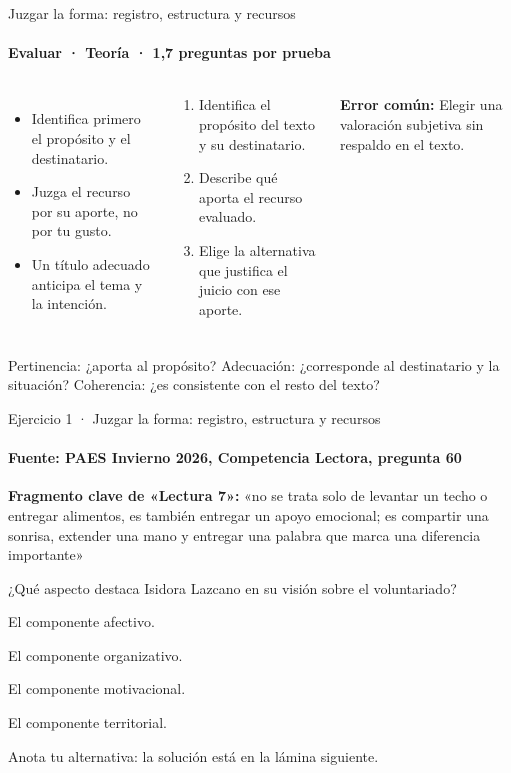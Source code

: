\documentclass[aspectratio=169,11pt]{beamer}
\newcommand{\alternativa}[2]{\begin{opcion}\tecla{#1}\hspace{0.6em}#2\end{opcion}}
\newlength{\ajustealto}
\newenvironment{ajustar}[1][0.74\textheight]
  {\setlength{\ajustealto}{#1}\begin{lrbox}{\ajustecaja}\begin{minipage}{\textwidth}}
  {\end{minipage}\end{lrbox}%
   \ifdim\dimexpr\ht\ajustecaja+\dp\ajustecaja\relax>\ajustealto
     \resizebox*{!}{\ajustealto}{\usebox{\ajustecaja}}\else\usebox{\ajustecaja}\fi}
\begin{document}
\begin{frame}{Juzgar la forma: registro, estructura y recursos}
\label{tema-cl-forma}
\framesubtitle{Evaluar · Teoría · 1,7 preguntas por prueba}
\begin{ajustar}
\begin{columns}[T,onlytextwidth]
\begin{itemize}\footnotesize
\item Identifica primero el propósito y el destinatario.
\item Juzga el recurso por su aporte, no por tu gusto.
\item Un título adecuado anticipa el tema y la intención.
\end{itemize}
\begin{cajaregla}\scriptsize \begin{enumerate}\item Identifica el propósito del texto y su destinatario.\item Describe qué aporta el recurso evaluado.\item Elige la alternativa que justifica el juicio con ese aporte.\end{enumerate}\end{cajaregla}
\begin{notagris}\scriptsize \textbf{Error común:} Elegir una valoración subjetiva sin respaldo en el texto.\end{notagris}
\end{columns}
\begin{cajaclave}[Criterios]\footnotesize
Pertinencia: ¿aporta al propósito? Adecuación: ¿corresponde al destinatario y la situación? Coherencia: ¿es consistente con el resto del texto?
\end{cajaclave}
\end{ajustar}
\end{frame}

\begin{frame}{Ejercicio 1 · Juzgar la forma: registro, estructura y recursos}
\framesubtitle{Fuente: PAES Invierno 2026, Competencia Lectora, pregunta 60}
\begin{ajustar}[0.7\textheight]
\begin{notagris}\scriptsize \textbf{Fragmento clave de «Lectura 7»:} «no se trata solo de levantar un techo o entregar alimentos, es también entregar un apoyo emocional; es compartir una sonrisa, extender una mano y entregar una palabra que marca una diferencia importante»\end{notagris}
{\small ¿Qué aspecto destaca Isidora Lazcano en su visión sobre el voluntariado?}
\vspace{0.4em}
\alternativa{A}{El componente afectivo.}
\alternativa{B}{El componente organizativo.}
\alternativa{C}{El componente motivacional.}
\alternativa{D}{El componente territorial.}
\end{ajustar}
\vfill{\tiny\color{zinc500}\hfill Anota tu alternativa: la solución está en la lámina siguiente.}
\end{frame}
\end{document}

